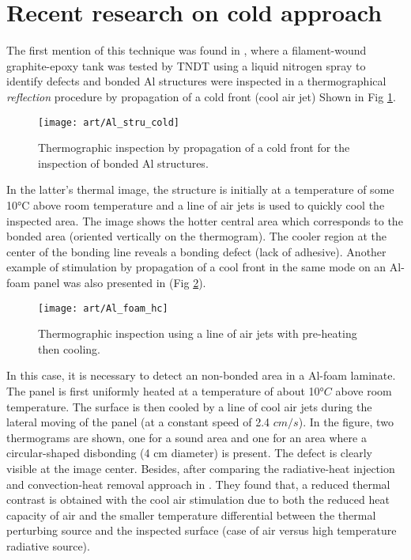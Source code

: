 \section{Recent research on cold approach}
The first mention of this technique was found in \citep{Maldague1993Nondestructive,Maldague1994bInfra}, where a filament-wound graphite-epoxy tank was tested by TNDT using a liquid nitrogen spray to identify defects and bonded Al structures were inspected  in a thermographical \textit{reflection} procedure by propagation of a cold front (cool air jet) Shown in Fig \ref{Al_stru_cold}. 
\begin{figure}[!htbp]
	\centering
	\texttt{[image: art/Al\_stru\_cold]}
	\caption{Thermographic inspection by propagation of a cold front for the inspection of bonded Al structures.}
	\label{Al_stru_cold}
\end{figure}
In the latter's thermal image, the structure is initially at a temperature of some 10°C above room temperature and a line
of air jets is used to quickly cool the inspected area. The image shows the hotter central area which corresponds to the bonded area (oriented vertically on the thermogram). The cooler region at the center of the bonding line reveals a bonding defect (lack of adhesive).
Another example of stimulation by propagation of a cool front in the same mode on an Al-foam panel was also presented in \citep{Maldague1993Nondestructive}(Fig \ref{Al_foam_hc}).
\begin{figure}[!htbp]
	\centering
	\texttt{[image: art/Al\_foam\_hc]}
	\caption{Thermographic inspection using a line of air jets with pre-heating then cooling.}
	\label{Al_foam_hc}
\end{figure}
In this case, it is necessary to detect an non-bonded area in a Al-foam laminate. The panel is first uniformly heated at a temperature of about 10$°C$ above room temperature. The surface is then cooled by a line of cool air jets during the lateral moving of the panel (at a constant speed of 2.4 $cm/s$). In the figure, two thermograms are shown, one for a sound area and one for an area where a circular-shaped disbonding (4 cm diameter) is present. The defect is clearly visible at the image
center. 
Besides, after comparing  the radiative-heat injection and convection-heat removal approach in \citep{Maldague1993Nondestructive}. They found that, a reduced thermal contrast is obtained with the cool air stimulation due to both the reduced heat capacity of air and the smaller temperature differential between the thermal perturbing source and the inspected surface (case of air versus high temperature radiative source). 

